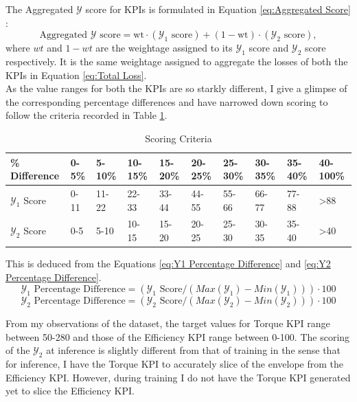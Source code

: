 \documentclass{report} %
\begin{document}
The Aggregated $\mathcal{Y}$ score for \ac{KPI}s is formulated in Equation \ref{eq:Aggregated Score} :
\begin{equation}
    \text{Aggregated $\mathcal{Y}$ score} = \text{wt} \cdot (\text{$\mathcal{Y}_1$ score}) + (1-\text{wt}) \cdot (\text{$\mathcal{Y}_2$ score}),
    \label{eq:Aggregated Score}
\end{equation}
where $wt$ and  $1-wt$ are the weightage assigned to its $\mathcal{Y}_1$ score and $\mathcal{Y}_2$ score respectively. 
It is the same weightage assigned to aggregate the losses of both the \ac{KPI}s in Equation \ref{eq:Total Loss}.\\

As the value ranges for both the \ac{KPI}s are so starkly different, I give a glimpse of the corresponding percentage differences and have narrowed down scoring to 
follow the criteria recorded in Table \ref{tab:Scoring Criteria}.
\begin{table}[H]
    \centering
    \begin{tabularx}{1\linewidth}{|X|X|X|X|X|X|X|X|X|X|}
    \hline {\bf \% Difference} & {\bf 0-5\%} & {\bf 5-10\%} & {\bf 10-15\%} & {\bf 15-20\%} & {\bf 20-25\%} & {\bf 25-30\%} & {\bf 30-35\%} & {\bf 35-40\%} & {\bf 40-100\%}\\
    \hline 
    $\mathcal{Y}_1$ Score& 0-11& 11-22 & 22-33 & 33-44 & 44-55& 55-66 & 66-77 & 77-88 & \textgreater 88\\
    $\mathcal{Y}_2$ Score& 0-5 & 5-10 & 10-15 & 15-20 & 20-25& 25-30 & 30-35 & 35-40 &\textgreater 40\\
    \hline
    \end{tabularx}
    \caption{Scoring Criteria}
    \label{tab:Scoring Criteria}
\end{table}

This is deduced from the Equations \ref{eq:Y1 Percentage Difference} and \ref{eq:Y2 Percentage Difference}.
\begin{equation}
    \text{$\mathcal{Y}_1$ Percentage Difference} = (\text{$\mathcal{Y}_1$ Score} / {(Max(\mathcal{Y}_1) - Min(\mathcal{Y}_1))})  \cdot 100
    \label{eq:Y1 Percentage Difference}
\end{equation}
\begin{equation}
    \text{$\mathcal{Y}_2$ Percentage Difference} = (\text{$\mathcal{Y}_2$ Score} / {(Max(\mathcal{Y}_2) - Min(\mathcal{Y}_2))})  \cdot 100
    \label{eq:Y2 Percentage Difference}
\end{equation}

From my observations of the dataset, the target values for Torque \ac{KPI} range between 50-280 and those of the Efficiency \ac{KPI} range between 0-100.
The scoring of the $\mathcal{Y}_2$ at inference is slightly different from that of training in the sense that for inference, I have the Torque \ac{KPI} to 
accurately slice of the envelope from the Efficiency \ac{KPI}. However, during training I do not have the Torque \ac{KPI} generated yet to slice the Efficiency \ac{KPI}.
\end{document}
